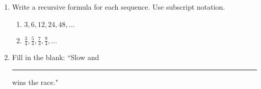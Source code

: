 \documentclass[12pt, twoside]{article}
\begin{document}
\begin{enumerate}[itemsep=0.5cm]
\item Write a recursive formula for each sequence. Use subscript notation.
    \begin{multicols}{2}
    \begin{enumerate}
        \item $3, 6, 12, 24, 48, \dots$
        \item $\displaystyle \frac{3}{4}, \frac{5}{4}, \frac{7}{4}, \frac{9}{4},  \dots$ 
    \end{enumerate}
    \end{multicols} \vspace{2cm}

\item Fill in the blank:
  ``Slow and \rule{3cm}{0.15mm}  wins the race."

\end{enumerate}
\end{document}
